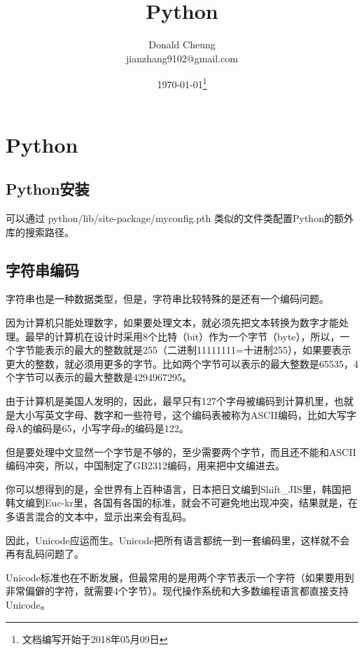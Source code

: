 \ifx\engineeringnotes\undefined
    \providecommand{\notesroot}{../..}
    \providecommand{\pythonroot}{.}

    \title{Python}
    \author{Donald Cheung\\jianzhang9102@gmail.com}
    \date{\today\footnote{文档编写开始于2018年05月09日}}

    
\else
    \providecommand{\pythonroot}{\engineeringroot/Python}
\fi

\chapter{Python}

\section{Python安装}

可以通过 python/lib/site-package/myconfig.pth 类似的文件类配置Python的额外库的搜索路径。


\section{字符串编码}
字符串也是一种数据类型，但是，字符串比较特殊的是还有一个编码问题。

因为计算机只能处理数字，如果要处理文本，就必须先把文本转换为数字才能处理。最早的计算机在设计时采用8个比特（bit）作为一个字节（byte），所以，一个字节能表示的最大的整数就是255（二进制11111111=十进制255），如果要表示更大的整数，就必须用更多的字节。比如两个字节可以表示的最大整数是65535，4个字节可以表示的最大整数是4294967295。

由于计算机是美国人发明的，因此，最早只有127个字母被编码到计算机里，也就是大小写英文字母、数字和一些符号，这个编码表被称为ASCII编码，比如大写字母A的编码是65，小写字母z的编码是122。

但是要处理中文显然一个字节是不够的，至少需要两个字节，而且还不能和ASCII编码冲突，所以，中国制定了GB2312编码，用来把中文编进去。

你可以想得到的是，全世界有上百种语言，日本把日文编到Shift\_JIS里，韩国把韩文编到Euc-kr里，各国有各国的标准，就会不可避免地出现冲突，结果就是，在多语言混合的文本中，显示出来会有乱码。

因此，Unicode应运而生。Unicode把所有语言都统一到一套编码里，这样就不会再有乱码问题了。

Unicode标准也在不断发展，但最常用的是用两个字节表示一个字符（如果要用到非常偏僻的字符，就需要4个字节）。现代操作系统和大多数编程语言都直接支持Unicode。

